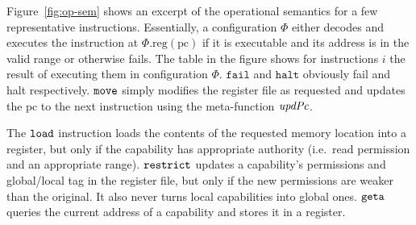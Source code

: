 \documentclass[format=acmsmall, review=false, screen=true]{acmart}
\renewcommand{\figurename}{Figure}
\newcommand{\update}[2]{[#1 \mapsto #2]}
\newcommand{\sem}[1]{\left\llbracket #1 \right\rrbracket}
\newcommand{\var}[1]{\mathit{#1}}
\newcommand{\lv}{\var{r}}
\newcommand{\gl}{\var{g}}
\newcommand{\pcreg}{\mathrm{pc}}
\newcommand{\addr}{\var{a}}
\newcommand{\start}{\var{b}}
\newcommand{\addrend}{\var{e}}
\newcommand{\perm}{\var{perm}}
\newcommand{\permp}{\var{permPair}}
\newcommand{\stdcap}[1][(\perm,\gl)]{\left(#1,\start,\addrend,\addr \right)}
\newcommand{\plainproj}[1]{\mathrm{#1}}
\newcommand{\memreg}[1][\Phi]{#1.\plainproj{reg}}
\newcommand{\updateHeap}[3][\Phi]{#1\update{\plainproj{mem}.#2}{#3}}
\newcommand{\updateReg}[3][\Phi]{#1\update{\plainproj{reg}.#2}{#3}}
\newcommand{\plainfun}[2]{
  \ifthenelse{\equal{#2}{}}
  {\mathit{#1}}
  {\mathit{#1}(#2)}
}
\newcommand{\decodePermPair}{\plainfun{decodePermPair}}
\newcommand{\updatePcPerm}[1]{\plainfun{updPcPerm}{#1}}
\newcommand{\stdUpdatePc}[1]{\plainfun{updPc}{#1}}
\newcommand{\refreg}[1]{#1}
\newcommand{\refheap}[1]{#1}
\newcommand{\zinstr}[1]{\mathtt{#1}}
\newcommand{\fail}{\zinstr{fail}}
\newcommand{\halt}{\zinstr{halt}}
\newcommand{\oneinstr}[2]{
  \ifthenelse{\equal{#2}{}}
  {\zinstr{#1}}
  {\zinstr{#1} \; #2}
}
\newcommand{\jmp}[1]{\oneinstr{jmp}{#1}}
\newcommand{\twoinstr}[3]{
  \ifthenelse{\equal{#2#3}{}}
  {\zinstr{#1}}
  {\zinstr{#1} \; #2 \; #3}
}
\newcommand{\restricttwo}[2]{\twoinstr{restrict}{#1}{#2}}
\newcommand{\geta}[2]{\twoinstr{geta}{#1}{#2}}
\newcommand{\move}[2]{\twoinstr{move}{#1}{#2}}
\newcommand{\store}[2]{\twoinstr{store}{#1}{#2}}
\newcommand{\load}[2]{\twoinstr{load}{#1}{#2}}
\newcommand{\plainperm}[1]{\textsc{#1}}
\newcommand{\readwrite}{\plainperm{rw}}
\newcommand{\rwx}{\plainperm{rwx}}
\newcommand{\readwritel}{\plainperm{rwl}}
\newcommand{\rwlx}{\plainperm{rwlx}}
\newcommand{\plainlocality}[1]{\mathrm{#1}}
\newcommand{\local}{\plainlocality{local}}
\newcommand{\itoplassug}[1]
    {{\color{Blue} #1}}
\begin{document}

\figurename~\ref{fig:op-sem}
shows an excerpt of the operational semantics for a
few representative instructions. Essentially, a configuration $\Phi$ either
decodes and executes the instruction at $\memreg(\pcreg)$ if it is executable
and its address is in the valid range or otherwise fails. The table in the
figure shows for instructions $i$ the result of executing them in configuration
$\Phi$. $\fail$ and $\halt$ obviously fail and halt respectively. $\move{}{}$
simply modifies the register file as requested and updates the $\pcreg$ to the
next instruction using the meta-function $\stdUpdatePc{}$.

The $\load{}{}$ instruction loads the contents of the requested memory location
into a register, but only if the capability has appropriate authority (i.e.\
read permission and an appropriate range). $\restricttwo{}{}$ updates a
capability's permissions and global/local tag in the register file, but only if the new permissions are weaker than the original. 
It also never turns local
capabilities into global ones. $\geta{}{}$ queries the current address of a
capability and stores it in a register.
\end{document}

